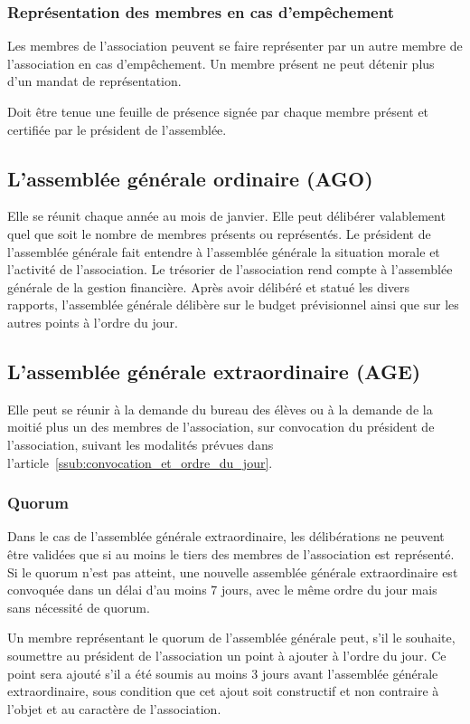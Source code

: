 \documentclass{article}
\begin{document}
			\subsubsection{Représentation des membres en cas d’empêchement}
				Les membres de l’association peuvent se faire représenter par un
				autre membre de l’association en cas d’empêchement. Un membre
				présent ne peut détenir plus d’un mandat de représentation.

				Doit être tenue une feuille de présence signée par chaque membre
				présent et certifiée par le président de l’assemblée.

		\subsection{L’assemblée générale ordinaire (AGO)}
			Elle se réunit chaque année au mois de janvier. Elle peut délibérer
			valablement quel que soit le nombre de membres présents ou
			représentés. Le président de l’assemblée générale fait entendre à
			l’assemblée générale la situation morale et l’activité de
			l’association. Le trésorier de l’association rend compte à
			l’assemblée générale de la gestion financière. Après avoir délibéré
			et statué les divers rapports, l’assemblée générale délibère sur le
			budget prévisionnel ainsi que sur les autres points à l’ordre du
			jour.

		\subsection{L’assemblée générale extraordinaire (AGE)}
			Elle peut se réunir à la demande du bureau des élèves ou à la
			demande de la moitié plus un des membres de l’association, sur
			convocation du président de l’association, suivant les modalités
			prévues dans l’article~\ref{ssub:convocation_et_ordre_du_jour}.

			\subsubsection{Quorum}
				Dans le cas de l’assemblée générale extraordinaire, les
				délibérations ne peuvent être validées que si au moins le tiers
				des membres de l’association est représenté. Si le quorum n’est
				pas atteint, une nouvelle assemblée générale extraordinaire est
				convoquée dans un délai d’au moins 7 jours, avec le même ordre
				du jour mais sans nécessité de quorum.

				Un membre représentant le quorum de l’assemblée générale peut,
				s’il le souhaite, soumettre au président de l’association un
				point à ajouter à l’ordre du jour. Ce point sera ajouté s’il a
				été soumis au moins 3 jours avant l’assemblée générale
				extraordinaire, sous condition que cet ajout soit constructif et
				non contraire à l'objet et au caractère de l’association.
\end{document}
